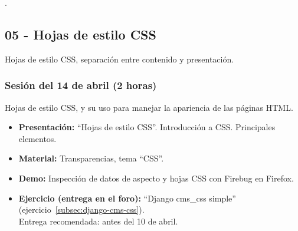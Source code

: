 \documentclass[a4paper,12pt]{article}
\begin{document}

.
%
%
%
%
\subsection{05 - Hojas de estilo CSS}

Hojas de estilo CSS, separación entre contenido y presentación.

\subsubsection{Sesión del 14 de abril (2 horas)}

Hojas de estilo CSS, y su uso para manejar la apariencia de las páginas HTML.

\begin{itemize}
\item \textbf{Presentación:} ``Hojas de estilo CSS''. Introducción a CSS. Principales elementos.
 \item \textbf{Material:} Transparencias, tema ``CSS''.
\item \textbf{Demo:} Inspección de datos de aspecto y hojas CSS con Firebug en Firefox.
\item \textbf{Ejercicio (entrega en el foro):} ``Django cms\_css simple'' (ejercicio~\ref{subsec:django-cms-css}). \\
Entrega recomendada: antes del 10 de abril.
\end{itemize}
\end{document}

